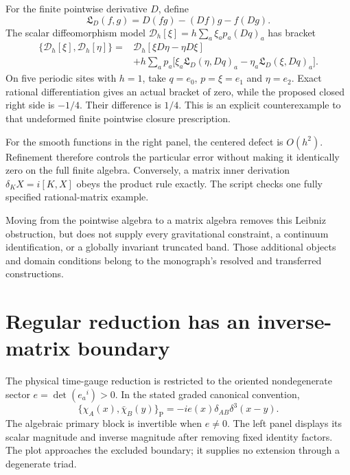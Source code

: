 For the finite pointwise derivative $D$, define
\[
\mathfrak L_D(f,g)=D(fg)-(Df)g-f(Dg).
\]
The scalar diffeomorphism model $\mathcal D_h[\xi]=h\sum_a\xi_ap_a(Dq)_a$ has bracket
\[
\begin{aligned}
\{\mathcal D_h[\xi],\mathcal D_h[\eta]\}
={}&\mathcal D_h[\xi D\eta-\eta D\xi]\\
&+h\sum_a p_a\bigl[\xi_a\mathfrak L_D(\eta,Dq)_a
-\eta_a\mathfrak L_D(\xi,Dq)_a\bigr].
\end{aligned}
\]
On five periodic sites with $h=1$, take $q=e_0$, $p=\xi=e_1$ and $\eta=e_2$. Exact rational differentiation gives an actual bracket of zero, while the proposed closed right side is $-1/4$. Their difference is $1/4$. This is an explicit counterexample to that undeformed finite pointwise closure prescription.

For the smooth functions in the right panel, the centered defect is $O(h^2)$. Refinement therefore controls the particular error without making it identically zero on the full finite algebra. Conversely, a matrix inner derivation $\delta_KX=i[K,X]$ obeys the product rule exactly. The script checks one fully specified rational-matrix example.

Moving from the pointwise algebra to a matrix algebra removes this Leibniz obstruction, but does not supply every gravitational constraint, a continuum identification, or a globally invariant truncated band. Those additional objects and domain conditions belong to the monograph's resolved and transferred constructions.



\clearpage
\section{Regular reduction has an inverse-matrix boundary}

The physical time-gauge reduction is restricted to the oriented nondegenerate sector $e=\det(e_a{}^i)>0$. In the stated graded canonical convention,
\[
\{\chi_A(x),\bar\chi_B(y)\}_{\mathrm P}
=-ie(x)\delta_{AB}\delta^3(x-y).
\]
The algebraic primary block is invertible when $e\ne0$. The left panel displays its scalar magnitude and inverse magnitude after removing fixed identity factors. The plot approaches the excluded boundary; it supplies no extension through a degenerate triad.

